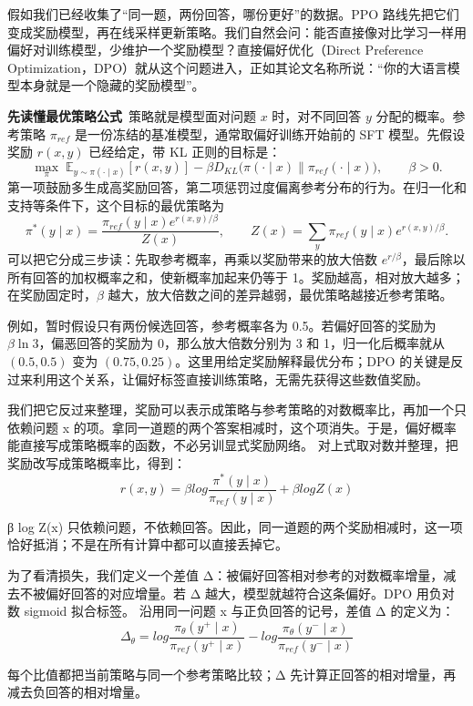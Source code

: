 假如我们已经收集了``同一题，两份回答，哪份更好''的数据。PPO 路线先把它们变成奖励模型，再在线采样更新策略。我们自然会问：能否直接像对比学习一样用偏好对训练模型，少维护一个奖励模型？直接偏好优化（Direct Preference Optimization，DPO）就从这个问题进入，正如其论文名称所说：``你的大语言模型本身就是一个隐藏的奖励模型''。

\textbf{先读懂最优策略公式}~策略就是模型面对问题 \(x\) 时，对不同回答 \(y\) 分配的概率。参考策略 \(\pi_{ref}\) 是一份冻结的基准模型，通常取偏好训练开始前的 SFT 模型。先假设奖励 \(r(x,y)\) 已经给定，带 KL 正则的目标是：
\[
\max_{\pi}\;\mathbb{E}_{y\sim\pi(\cdot\mid x)}[r(x,y)]
-\beta D_{KL}\bigl(\pi(\cdot\mid x)\|\pi_{ref}(\cdot\mid x)\bigr),\qquad\beta>0.
\]
第一项鼓励多生成高奖励回答，第二项惩罚过度偏离参考分布的行为。在归一化和支持等条件下，这个目标的最优策略为
\[
\pi^*(y\mid x)=\frac{\pi_{ref}(y\mid x)e^{r(x,y)/\beta}}{Z(x)},
\qquad Z(x)=\sum_y\pi_{ref}(y\mid x)e^{r(x,y)/\beta}.
\]
可以把它分成三步读：先取参考概率，再乘以奖励带来的放大倍数 \(e^{r/\beta}\)，最后除以所有回答的加权概率之和，使新概率加起来仍等于 1。奖励越高，相对放大越多；在奖励固定时，\(\beta\) 越大，放大倍数之间的差异越弱，最优策略越接近参考策略。

例如，暂时假设只有两份候选回答，参考概率各为 0.5。若偏好回答的奖励为 \(\beta\ln3\)，偏恶回答的奖励为 0，那么放大倍数分别为 3 和 1，归一化后概率就从 \((0.5,0.5)\) 变为 \((0.75,0.25)\)。这里用给定奖励解释最优分布；DPO 的关键是反过来利用这个关系，让偏好标签直接训练策略，无需先获得这些数值奖励。

我们把它反过来整理，奖励可以表示成策略与参考策略的对数概率比，再加一个只依赖问题 x 的项。拿同一道题的两个答案相减时，这个项消失。于是，偏好概率能直接写成策略概率的函数，不必另训显式奖励网络。 对上式取对数并整理，把奖励改写成策略概率比，得到：
\[r(x,y) = \beta log\frac{\pi^{*}(y \mid x)}{\pi_{ref}(y \mid x)} + \beta logZ(x)\]

β log Z(x) 只依赖问题，不依赖回答。因此，同一道题的两个奖励相减时，这一项恰好抵消；不是在所有计算中都可以直接丢掉它。

为了看清损失，我们定义一个差值 Δ：被偏好回答相对参考的对数概率增量，减去不被偏好回答的对应增量。若 Δ 越大，模型就越符合这条偏好。DPO 用负对数 sigmoid 拟合标签。 沿用同一问题 x 与正负回答的记号，差值 Δ 的定义为：
\[\Delta_{\theta} = log\frac{\pi_{\theta}\left( y^{+} \mid x \right)}{\pi_{ref}\left( y^{+} \mid x \right)} - log\frac{\pi_{\theta}\left( y^{-} \mid x \right)}{\pi_{ref}\left( y^{-} \mid x \right)}\]

每个比值都把当前策略与同一个参考策略比较；Δ 先计算正回答的相对增量，再减去负回答的相对增量。

